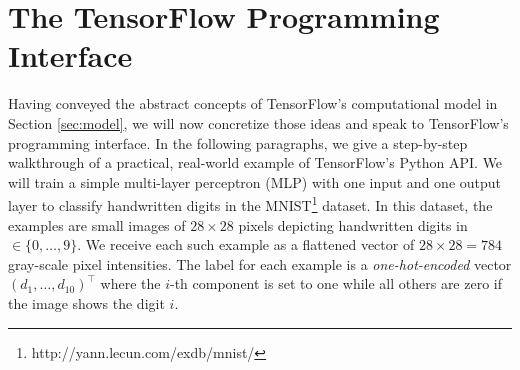 \section{The TensorFlow Programming Interface}\label{sec:code}

Having conveyed the abstract concepts of TensorFlow's computational model in
Section \ref{sec:model}, we will now concretize those ideas and speak to
TensorFlow's programming interface. In the following paragraphs, we give a
step-by-step walkthrough of a practical, real-world example of TensorFlow's
Python API. We will train a simple multi-layer perceptron (MLP) with one input
and one output layer to classify handwritten digits in the
MNIST\footnote{http://yann.lecun.com/exdb/mnist/} dataset. In this dataset, the
examples are small images of $28 \times 28$ pixels depicting handwritten digits
in $\in \{0, \dots, 9\}$. We receive each such example as a flattened vector of
$28 \times 28 = 784$ gray-scale pixel intensities. The label for each example is
a \emph{one-hot-encoded} vector $(d_1, \dots, d_{10})^\top$ where the $i$-th
component is set to one while all others are zero if the image shows the digit
$i$.

